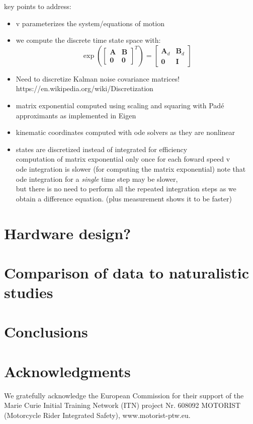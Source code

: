 \documentclass[11pt,a4paper,reqno]{amsart}
\newcommand{\stateMat}{\bm{A}}
\newcommand{\inputMat}{\bm{B}}
\begin{document}
key points to address:
\begin{itemize}
    \item v parameterizes the system/equations of motion
    \item we compute the discrete time state space with:
        \begin{equation}
        \exp(\begin{bmatrix} \stateMat & \inputMat \\ \bm{0} & \bm{0} \end{bmatrix}^T)
            = \begin{bmatrix} \stateMat_d & \inputMat_d \\ \bm{0} & \bm{I} \end{bmatrix}
        \end{equation}
    \item Need to discretize Kalman noise covariance matrices!
        https://en.wikipedia.org/wiki/Discretization
    \item matrix exponential computed using scaling and squaring with
        Pad{\'e} approximants\cite{higham2005} as implemented in Eigen\cite{eigenweb}
    \item kinematic coordinates computed with ode solvers as they are nonlinear
    \item states are discretized instead of integrated for efficiency\\
        computation of matrix exponential only once for each foward speed v\\
        ode integration is slower\cite{moler2003} (for computing the matrix exponential)
        note that ode integration for a \textit{single} time step may be slower, \\
        but there is no need to perform all the repeated integration steps as
        we obtain a difference equation. (plus measurement shows it to be faster)
\end{itemize}

\section{Hardware design?}

\section{Comparison of data to naturalistic studies}

\section{Conclusions}

\section{Acknowledgments}
We gratefully acknowledge the European Commission for their support of the Marie Curie Initial Training Network (ITN)
project Nr. 608092 MOTORIST (Motorcycle Rider Integrated Safety), www.motorist-ptw.eu.



\end{document}
